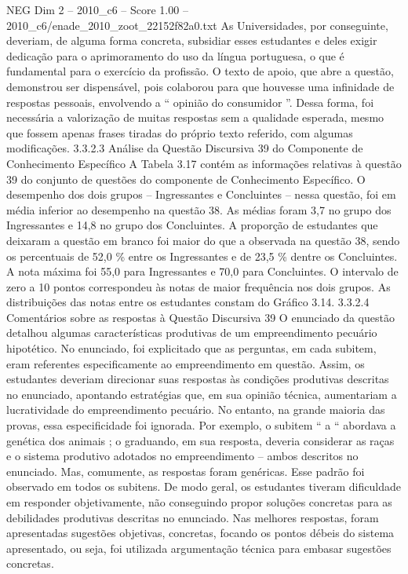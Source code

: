 \begin{textsample}{NEG Dim 2 – 2010\_c6 – Score 1.00 – 2010\_c6/enade\_2010\_zoot\_22152f82a0.txt}
As Universidades, por conseguinte, deveriam, de alguma forma concreta, subsidiar esses estudantes e deles exigir dedicação para o aprimoramento do uso da língua portuguesa, o que é fundamental para o exercício da profissão.
O texto de apoio, que abre a questão, demonstrou ser dispensável, pois colaborou para que houvesse uma infinidade de respostas pessoais, envolvendo a “ opinião do consumidor ”.
Dessa forma, foi necessária a valorização de muitas respostas sem a qualidade esperada, mesmo que fossem apenas frases tiradas do próprio texto referido, com algumas modificações. 3.3.2.3 Análise da Questão Discursiva 39 do Componente de Conhecimento Específico A Tabela 3.17 contém as informações relativas à questão 39 do conjunto de questões do componente de Conhecimento Específico.
O desempenho dos dois grupos – Ingressantes e Concluintes – nessa questão, foi em média inferior ao desempenho na questão 38.
As médias foram 3,7 no grupo dos Ingressantes e 14,8 no grupo dos Concluintes.
A proporção de estudantes que deixaram a questão em branco foi maior do que a observada na questão 38, sendo os percentuais de 52,0 \% entre os Ingressantes e de 23,5 \% dentre os Concluintes.
A nota máxima foi 55,0 para Ingressantes e 70,0 para Concluintes.
O intervalo de zero a 10 pontos correspondeu às notas de maior frequência nos dois grupos.
As distribuições das notas entre os estudantes constam do Gráfico 3.14. 3.3.2.4 Comentários sobre as respostas à Questão Discursiva 39 O enunciado da questão detalhou algumas características produtivas de um empreendimento pecuário hipotético.
No enunciado, foi explicitado que as perguntas, em cada subitem, eram referentes especificamente ao empreendimento em questão.
Assim, os estudantes deveriam direcionar suas respostas às condições produtivas descritas no enunciado, apontando estratégias que, em sua opinião técnica, aumentariam a lucratividade do empreendimento pecuário.
No entanto, na grande maioria das provas, essa especificidade foi ignorada.
Por exemplo, o subitem “ a “ abordava a genética dos animais ; o graduando, em sua resposta, deveria considerar as raças e o sistema produtivo adotados no empreendimento – ambos descritos no enunciado.
Mas, comumente, as respostas foram genéricas.
Esse padrão foi observado em todos os subitens.
De modo geral, os estudantes tiveram dificuldade em responder objetivamente, não conseguindo propor soluções concretas para as debilidades produtivas descritas no enunciado.
Nas melhores respostas, foram apresentadas sugestões objetivas, concretas, focando os pontos débeis do sistema apresentado, ou seja, foi utilizada argumentação técnica para embasar sugestões concretas.

\end{textsample}
